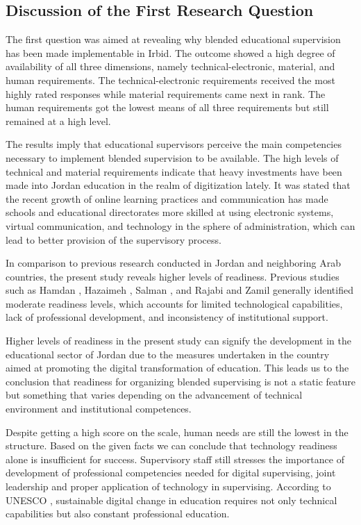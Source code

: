 \documentclass[10pt]{NSP1}
\begin{document}
\subsection{Discussion of the First Research Question}

The first question was aimed at revealing why blended educational supervision has been made implementable in Irbid. The outcome showed a high degree of availability of all three dimensions, namely technical-electronic, material, and human requirements. The technical-electronic requirements received the most highly rated responses while material requirements came next in rank. The human requirements got the lowest means of all three requirements but still remained at a high level.

The results imply that educational supervisors perceive the main competencies necessary to implement blended supervision to be available. The high levels of technical and material requirements indicate that heavy investments have been made into Jordan education in the realm of digitization lately. It was stated that the recent growth of online learning practices and communication has made schools and educational directorates more skilled at using electronic systems, virtual communication, and technology in the sphere of administration, which can lead to better provision of the supervisory process.

In comparison to previous research conducted in Jordan and neighboring Arab countries, the present study reveals higher levels of readiness. Previous studies such as Hamdan \cite{ref21}, Hazaimeh \cite{ref18}, Salman \cite{ref22}, and Rajabi and Zamil \cite{ref23}generally identified moderate readiness levels, which accounts for limited technological capabilities, lack of professional development, and inconsistency of institutional support.

Higher levels of readiness in the present study can signify the development in the educational sector of Jordan due to the measures undertaken in the country aimed at promoting the digital transformation of education. This leads us to the conclusion that readiness for organizing blended supervising is not a static feature but something that varies depending on the advancement of technical environment and institutional competences.

Despite getting a high score on the scale, human needs are still the lowest in the structure. Based on the given facts we can conclude that technology readiness alone is insufficient for success. Supervisory staff still stresses the importance of development of professional competencies needed for digital supervising, joint leadership and proper application of technology in supervising. According to UNESCO \cite{ref1}, sustainable digital change in education requires not only technical capabilities but also constant professional education.
\end{document}
